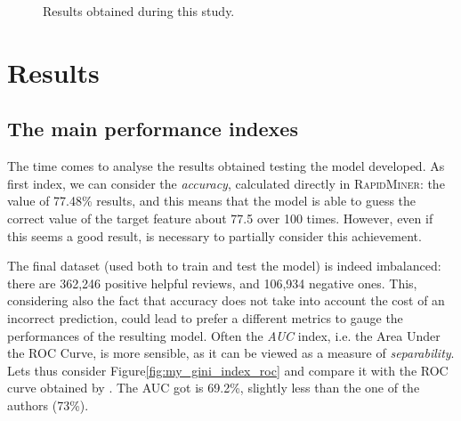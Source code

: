 \documentclass[a4paper]{article}
\begin{document}
		\begin{figure}[p]
			\centering
			\quad
			\caption{Results obtained during this study.}
			\label{fig:my_results}
		\end{figure}
	
		 			 	
	\section{Results}
		\subsection{The main performance indexes}
			The time comes to analyse the results obtained testing the model developed. As first index, we can consider the \emph{accuracy}, calculated directly in \textsc{RapidMiner}: the value of 77.48\% results, and this means that the model is able to guess the correct value of the target feature about 77.5 over 100 times.
			However, even if this seems a good result, is necessary to partially consider this achievement.
			
			The final dataset (used both to train and test the model) is indeed imbalanced: there are 362,246 positive helpful reviews, and 106,934 negative ones. This, considering also the fact that accuracy does not take into account the cost of an incorrect prediction, could lead to prefer a different metrics to gauge the performances of the resulting model. Often the \emph{AUC} index, i.e. the Area Under the ROC Curve, is more sensible, as it can be viewed as a measure of \emph{separability}. Lets thus consider Figure\autoref{fig:my_gini_index_roc} and compare it with the ROC curve obtained by \citeauthor{article:muller}. The AUC got is 69.2\%, slightly less than the one of the authors (73\%).
			
\end{document}
